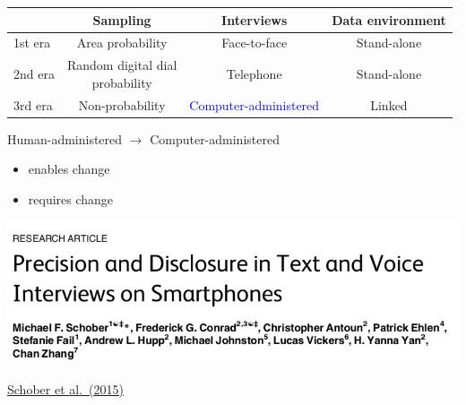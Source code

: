 \documentclass[aspectratio=169]{beamer}
\begin{document}
\begin{frame}

\begin{center}
\small{
\begin{tabular}{ l c c c}
           & Sampling & Interviews & Data environment\\
\hline
1st era & Area probability & Face-to-face & Stand-alone \\
2nd era & \parbox[t]{3cm}{\centering Random digital dial\\probability} & Telephone & Stand-alone \\
3rd era & Non-probability & \textcolor{blue}{Computer-administered} & Linked \\
\end{tabular}
}
\end{center}

\end{frame}
\begin{frame}

\begin{center}
Human-administered $\rightarrow$ Computer-administered
\end{center}

\begin{itemize}
\item enables change
\item requires change
\end{itemize}

\end{frame}
\begin{frame}

\begin{center}
\includegraphics[width=\textwidth]{figures/schober_precision_2015_title}
\end{center}

\vfill
\href{https://doi.org/10.1371/journal.pone.0128337}{Schober et al.\ (2015)}

\end{frame}
\end{document}

